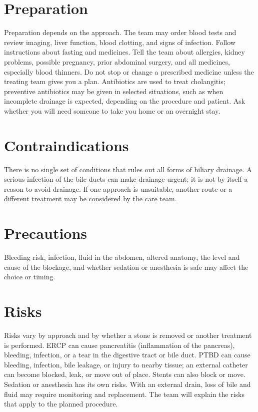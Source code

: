 \section*{Preparation}
Preparation depends on the approach. The team may order blood tests and review imaging, liver function, blood clotting, and signs of infection. Follow instructions about fasting and medicines. Tell the team about allergies, kidney problems, possible pregnancy, prior abdominal surgery, and all medicines, especially blood thinners. Do not stop or change a prescribed medicine unless the treating team gives you a plan. Antibiotics are used to treat cholangitis; preventive antibiotics may be given in selected situations, such as when incomplete drainage is expected, depending on the procedure and patient. Ask whether you will need someone to take you home or an overnight stay.

\section*{Contraindications}
There is no single set of conditions that rules out all forms of biliary drainage. A serious infection of the bile ducts can make drainage urgent; it is not by itself a reason to avoid drainage. If one approach is unsuitable, another route or a different treatment may be considered by the care team.

\section*{Precautions}
Bleeding risk, infection, fluid in the abdomen, altered anatomy, the level and cause of the blockage, and whether sedation or anesthesia is safe may affect the choice or timing.

\section*{Risks}
Risks vary by approach and by whether a stone is removed or another treatment is performed. ERCP can cause pancreatitis (inflammation of the pancreas), bleeding, infection, or a tear in the digestive tract or bile duct. PTBD can cause bleeding, infection, bile leakage, or injury to nearby tissue; an external catheter can become blocked, leak, or move out of place. Stents can also block or move. Sedation or anesthesia has its own risks. With an external drain, loss of bile and fluid may require monitoring and replacement. The team will explain the risks that apply to the planned procedure.

